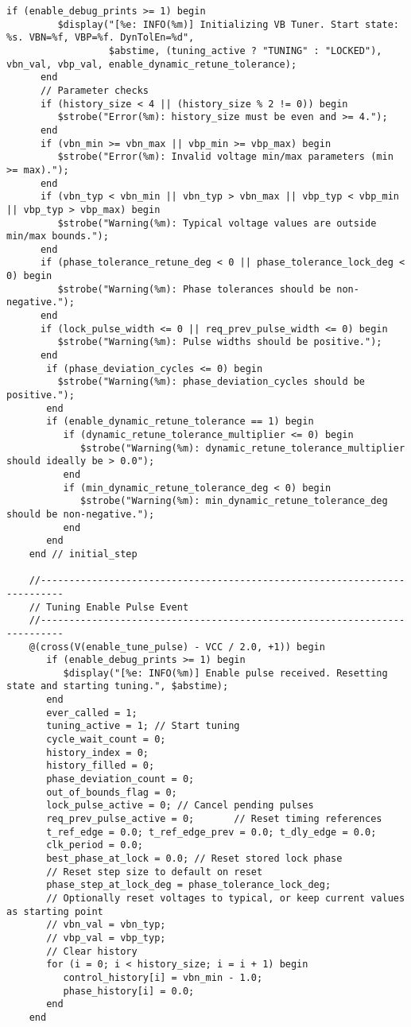 \begin{lstlisting}[caption={Verilog-A Generic Vb Tuner Implementation}]
      if (enable_debug_prints >= 1) begin
         $display("[%e: INFO(%m)] Initializing VB Tuner. Start state: %s. VBN=%f, VBP=%f. DynTolEn=%d",
                  $abstime, (tuning_active ? "TUNING" : "LOCKED"), vbn_val, vbp_val, enable_dynamic_retune_tolerance);
      end
      // Parameter checks
      if (history_size < 4 || (history_size % 2 != 0)) begin
         $strobe("Error(%m): history_size must be even and >= 4.");
      end
      if (vbn_min >= vbn_max || vbp_min >= vbp_max) begin
         $strobe("Error(%m): Invalid voltage min/max parameters (min >= max).");
      end
      if (vbn_typ < vbn_min || vbn_typ > vbn_max || vbp_typ < vbp_min || vbp_typ > vbp_max) begin
         $strobe("Warning(%m): Typical voltage values are outside min/max bounds.");
      end
      if (phase_tolerance_retune_deg < 0 || phase_tolerance_lock_deg < 0) begin
         $strobe("Warning(%m): Phase tolerances should be non-negative.");
      end
      if (lock_pulse_width <= 0 || req_prev_pulse_width <= 0) begin
         $strobe("Warning(%m): Pulse widths should be positive.");
      end
       if (phase_deviation_cycles <= 0) begin
         $strobe("Warning(%m): phase_deviation_cycles should be positive.");
       end
       if (enable_dynamic_retune_tolerance == 1) begin
          if (dynamic_retune_tolerance_multiplier <= 0) begin
             $strobe("Warning(%m): dynamic_retune_tolerance_multiplier should ideally be > 0.0");
          end
          if (min_dynamic_retune_tolerance_deg < 0) begin
             $strobe("Warning(%m): min_dynamic_retune_tolerance_deg should be non-negative.");
          end
       end
    end // initial_step

    //--------------------------------------------------------------------------
    // Tuning Enable Pulse Event
    //--------------------------------------------------------------------------
    @(cross(V(enable_tune_pulse) - VCC / 2.0, +1)) begin
       if (enable_debug_prints >= 1) begin
          $display("[%e: INFO(%m)] Enable pulse received. Resetting state and starting tuning.", $abstime);
       end
       ever_called = 1;
       tuning_active = 1; // Start tuning
       cycle_wait_count = 0;
       history_index = 0;
       history_filled = 0;
       phase_deviation_count = 0;
       out_of_bounds_flag = 0;
       lock_pulse_active = 0; // Cancel pending pulses
       req_prev_pulse_active = 0;       // Reset timing references
       t_ref_edge = 0.0; t_ref_edge_prev = 0.0; t_dly_edge = 0.0;
       clk_period = 0.0;
       best_phase_at_lock = 0.0; // Reset stored lock phase
       // Reset step size to default on reset
       phase_step_at_lock_deg = phase_tolerance_lock_deg;
       // Optionally reset voltages to typical, or keep current values as starting point
       // vbn_val = vbn_typ;
       // vbp_val = vbp_typ;
       // Clear history
       for (i = 0; i < history_size; i = i + 1) begin
          control_history[i] = vbn_min - 1.0;
          phase_history[i] = 0.0;
       end
    end


\end{lstlisting}
